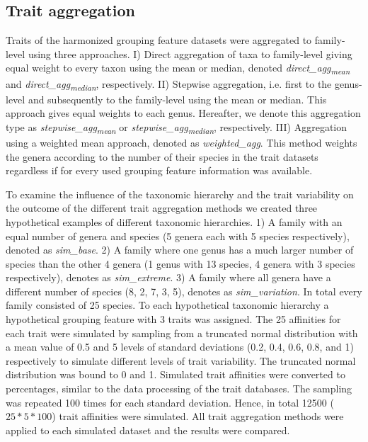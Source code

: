 \documentclass{article}
\begin{document}
\newpage

\subsection*{Trait aggregation}

Traits of the harmonized grouping feature datasets were aggregated to family-level using three approaches. I) Direct aggregation of taxa to family-level giving equal weight to every taxon using the mean or median, denoted \textit{direct\_agg\textsubscript{mean}} and \textit{direct\_agg\textsubscript{median}}, respectively. II) Stepwise aggregation, i.e. first to the genus-level and subsequently to the family-level using the mean or median. This approach gives equal weights to each genus. Hereafter, we denote this aggregation type as \textit{stepwise\_agg\textsubscript{mean}} or \textit{stepwise\_agg\textsubscript{median}}, respectively. III) Aggregation using a weighted mean approach, denoted as \textit{weighted\_agg}. This method weights the genera according to the number of their species in the trait datasets regardless if for every used grouping feature information was available. 

To examine the influence of the taxonomic hierarchy and the trait variability on the outcome of the different trait aggregation methods we created three hypothetical examples of different taxonomic hierarchies. 
1) A family with an equal number of genera and species (5 genera each with 5 species respectively), denoted as \textit{sim\_base}.
2) A family where one genus has a much larger number of species than the other 4 genera (1 genus with 13 species, 4 genera with 3 species respectively), denotes as \textit{sim\_extreme}. 
3) A family where all genera have a different number of species (8, 2, 7, 3, 5), denotes as \textit{sim\_variation}. In total every family consisted of 25 species. To each hypothetical taxonomic hierarchy a hypothetical grouping feature with 3 traits was assigned. The 25 affinities for each trait were simulated by sampling from a truncated normal distribution with a mean value of 0.5 and 5 levels of standard deviations (0.2, 0.4, 0.6, 0.8, and 1) respectively to simulate different levels of trait variability. The truncated normal distribution was bound to 0 and 1. Simulated trait affinities were converted to percentages, similar to the data processing of the trait databases. The sampling was repeated 100 times for each standard deviation. Hence, in total 12500 ($25 * 5 * 100$) trait affinities were simulated. All trait aggregation methods were applied to each simulated dataset and the results were compared.   
\end{document}
